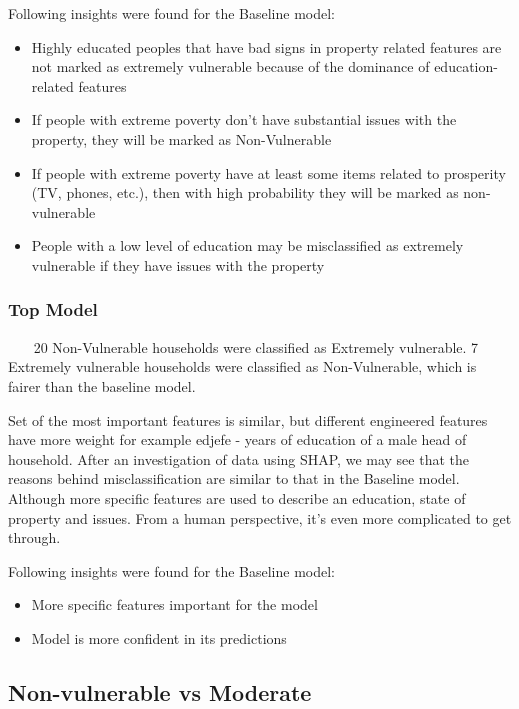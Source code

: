         Following insights were found for the Baseline model:
        \begin{itemize}
            \item Highly educated peoples that have bad signs in property related features are not marked as extremely vulnerable because of the dominance of education-related features
            \item If people with extreme poverty don't have substantial issues with the property, they will be marked as Non-Vulnerable
            \item If people with extreme poverty have at least some items related to prosperity (TV, phones, etc.), then with high probability they will be marked as non-vulnerable
            \item People with a low level of education may be misclassified as extremely vulnerable if they have issues with the property
        \end{itemize}
        
    \subsubsection{Top Model}~~~
        20 Non-Vulnerable households were classified as Extremely vulnerable. 7 Extremely vulnerable households were classified as Non-Vulnerable, which is fairer than the baseline model.

        Set of the most important features is similar, but different engineered features have more weight for example edjefe - years of education of a male head of household. After an investigation of data using SHAP, we may see that the reasons behind misclassification are similar to that in the Baseline model. Although more specific features are used to describe an education, state of property and issues. From a human perspective, it's even more complicated to get through.
        
        Following insights were found for the Baseline model:
        \begin{itemize}
            \item More specific features important for the model
            \item Model is more confident in its predictions
        \end{itemize}
        
    \subsection{Non-vulnerable vs Moderate}
